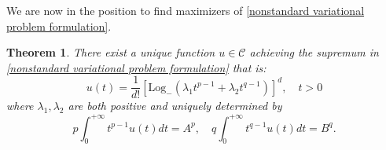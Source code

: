 \documentclass[corpo=11pt, stile=classica, tipotesi=custom,
greek, evenboxes, english]{toptesi}
\numberwithin{equation}{chapter}
\newtheorem{teo}{Theorem}[chapter] %
\theoremstyle{definition}
\theoremstyle{remark}
\newcommand{\Log}{\ensuremath{\mathrm{Log}_-}}
\begin{document}
We are now in the position to find maximizers of \eqref{nonstandard variational problem formulation}.
\begin{teo}\label{nonstandard variational problem solution theorem}
	There exist a unique function $u \in \mathcal{C}$ achieving the supremum in \eqref{nonstandard variational problem formulation} that is:
	\begin{equation}\label{nonstandard variational problem solution formula}
		u(t) = \dfrac{1}{d!} \left[\Log\left(\lambda_1 t^{p-1} + \lambda_2 t^{q-1}\right)\right]^d, \quad t>0
	\end{equation}
	where $\lambda_1, \lambda_2$ are both positive and uniquely determined by
	\begin{equation*}
		p\int_0^{+\infty} t^{p-1}u(t)dt = A^p, \quad q\int_0^{+\infty} t^{q-1}u(t)dt = B^q.
	\end{equation*}
\end{teo}
\end{document}
